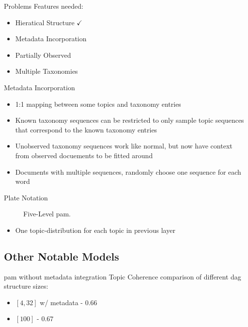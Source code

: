 \begin{frame}{\insertsubsection}{Problems}
	Features needed:
	\begin{itemize}
		\item Hieratical Structure $\checkmark$
		\item Metadata Incorporation
		\item Partially Observed
		\item Multiple Taxonomies
	\end{itemize}
\end{frame}

\begin{frame}{\insertsubsection}{Metadata Incorporation}
	\begin{itemize}
		\item<1-> 1:1 mapping between some topics and taxonomy entries
		\only<2>{\newline}
		\item<3-> Known taxonomy sequences can be restricted to only sample topic sequences that correspond to the known taxonomy entries
		\item<4-> Unobserved taxonomy sequences work like normal, but now have context from observed docuements to be fitted around
		\item<5-> Documents with multiple sequences, randomly choose one sequence for each word
	\end{itemize}
\end{frame}

\begin{frame}{\insertsubsection}{Plate Notation}
	\begin{figure}
		\centering
		\resizebox{0.5\columnwidth}{!}{%
			
		}
		\caption{Five-Level \gls{pam}.}
	\end{figure}

	\begin{itemize}
		\item One topic-distribution for each topic in previous layer
	\end{itemize}
\end{frame}

\subsection{Other Notable Models}

\begin{frame}{\insertsubsection}{\gls{pam} without metadata integration}
	Topic Coherence comparison of different \gls{dag} structure sizes:
	\begin{itemize}
		\item $[4, 32]$ w/ metadata - $0.66$
		\item $[100]$ - $0.67$
	\end{itemize}
\end{frame}


